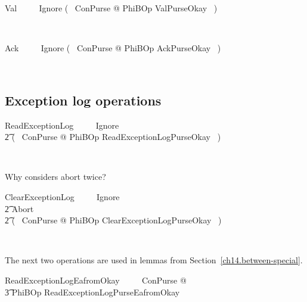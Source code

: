\begin{LSDef}
\begin{zed}
  Val ~~~~ Ignore \lor (~ \exists \Delta ConPurse  @
  PhiBOp \land ValPurseOkay ~)
\end{zed}~\end{LSDef}

\begin{LSDef}
\begin{zed}
  Ack ~~~~ Ignore \lor (~ \exists \Delta ConPurse @
  PhiBOp \land AckPurseOkay ~)
\end{zed}~\end{LSDef}

\subsection{Exception log operations}\label{ch5.promoted.exception}

\begin{LSDef}
\begin{zed}
  ReadExceptionLog ~~~~ Ignore
  \\ \t2                \lor (~ \exists \Delta ConPurse @
  PhiBOp \land ReadExceptionLogPurseOkay ~)
\end{zed}~\end{LSDef}

Why considers abort twice?
%
\begin{LSDef}
\begin{zed}
  ClearExceptionLog ~~~~ Ignore
  \\ \t2                \lor Abort
  \\ \t2                \lor (~ \exists \Delta ConPurse @
  PhiBOp \land ClearExceptionLogPurseOkay ~)
\end{zed}~\end{LSDef}

The next two operations are used in lemmas from Section~\ref{ch14.between-special}.
%
\begin{LSDef}
\begin{zed}
  ReadExceptionLogEafromOkay ~~~~ \exists \Delta ConPurse @
  \\ \t3                        PhiBOp \land ReadExceptionLogPurseEafromOkay
\end{zed}~\end{LSDef}

